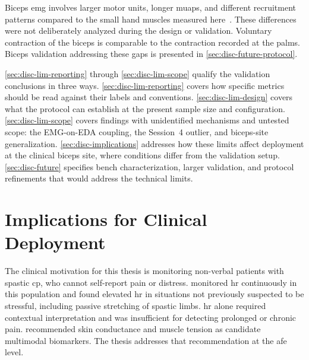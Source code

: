 Biceps \gls{emg} involves larger motor units, longer \glspl{muap}, and different recruitment patterns compared to the small hand muscles measured here~\cite{kamen_essentials_2010}. These differences were not deliberately analyzed during the design or validation. Voluntary contraction of the biceps is comparable to the contraction recorded at the palms. Biceps validation addressing these gaps is presented in \autoref{sec:disc-future-protocol}.


\autoref{sec:disc-lim-reporting} through \autoref{sec:disc-lim-scope} qualify the validation conclusions in three ways. \autoref{sec:disc-lim-reporting} covers how specific metrics should be read against their labels and conventions. \autoref{sec:disc-lim-design} covers what the protocol can establish at the present sample size and configuration. \autoref{sec:disc-lim-scope} covers findings with unidentified mechanisms and untested scope: the EMG-on-EDA coupling, the Session~4 outlier, and biceps-site generalization. \autoref{sec:disc-implications} addresses how these limits affect deployment at the clinical biceps site, where conditions differ from the validation setup. \autoref{sec:disc-future} specifies bench characterization, larger validation, and protocol refinements that would address the technical limits.



\section{Implications for Clinical Deployment}
\label{sec:disc-implications}

The clinical motivation for this thesis is monitoring non-verbal patients with spastic \gls{cp}, who cannot self-report pain or distress. \textcite{kildal_increased_2021} monitored \gls{hr} continuously in this population and found elevated \gls{hr} in situations not previously suspected to be stressful, including passive stretching of spastic limbs. \gls{hr} alone required contextual interpretation and was insufficient for detecting prolonged or chronic pain. \textcite{bull_heart_2025} recommended skin conductance and muscle tension as candidate multimodal biomarkers. The thesis addresses that recommendation at the \gls{afe} level.

